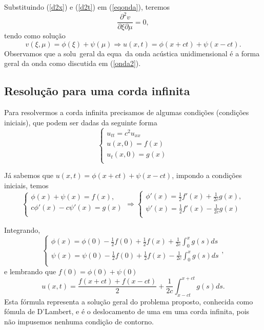 Substituindo (\ref{d2x}) e (\ref{d2t}) em (\ref{eqonda}), teremos
\[
\frac{\partial^{2}v}{\partial \xi \partial \mu}=0,
\]
tendo como solu\c{c}\~ao
\[
v(\xi, \mu)=\phi(\xi)+\psi(\mu)\Rightarrow u(x,t)=\phi(x+ct)+\psi(x-ct).
\]
Observamos que a solu\cao\ geral da equa\cao\ da onda ac\'ustica
unidimensional \'e a forma geral da onda como discutida em
(\ref{onda2}).

\subsection{Resolu\c{c}\~ao para uma corda infinita}

Para resolvermos a corda infinita precisamos de algumas
condi\c{c}\~oes (condi\c{c}\~oes iniciais), que podem ser dadas da
seguinte forma
\[\left \{ \begin{array}{l}
                u_{tt}=c^{2}u_{xx}\\
               u(x,0)=f(x)\\
               u_{t}(x,0)=g(x)\\
 \end{array} \right. \]

J\'a sabemos que $u(x,t)=\phi(x+ct)+\psi(x-ct)$, impondo a
condi\c{c}\~oes iniciais, temos
\[\left \{ \begin{array}{l}
               \phi(x)+\psi(x)=f(x),\\
                c\phi'(x)-c\psi'(x)=g(x)\\
\end{array} \right. \Rightarrow \left \{ \begin{array}{l}
               \phi'(x)=\frac{1}{2}f'(x)+\frac{1}{2c}g(x),\\
                \psi'(x)=\frac{1}{2}f'(x)-\frac{1}{2c}g(x)\\
\end{array} \right.\]

Integrando,
\[\left \{ \begin{array}{l}
                \phi(x)=\phi(0)-\frac{1}{2}f(0)+\frac{1}{2}f(x)+\frac{1}{2c}\int_{0}^{x}g(s)ds\\
                \psi(x)=\psi(0)-\frac{1}{2}f(0)+\frac{1}{2}f(x)-\frac{1}{2c}\int_{0}^{x}g(s)ds\\
\end{array} \right. ,\]
 e lembrando que $f(0)=\phi(0)+\psi(0)$
\begin{equation}\label{solonda}
u(x,t)=\frac{f(x+ct)+f(x-ct)}{2}+\frac{1}{2c}\int_{x-ct}^{x+ct}g(s)ds.
\end{equation}
Esta f\'ormula representa a solu\c{c}\~ao geral do problema
proposto, conhecida como f\'omula de D'Lambert, e \'e o
deslocamento de uma em uma corda infinita, pois n\~ao impusemos
nenhuma condi\c{c}\~ao de contorno.

